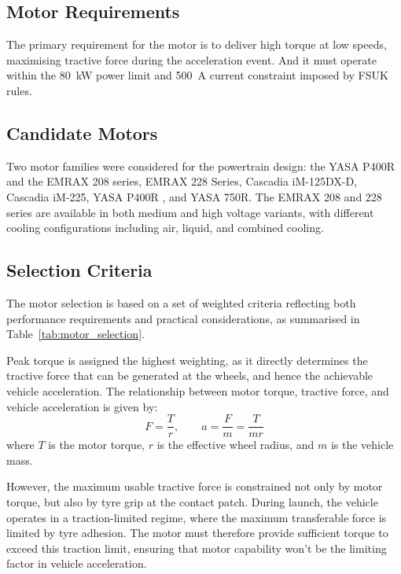 \documentclass[11pt, a4paper]{report}
\numberwithin{equation}{section}
\begin{document}
\begin{refsection}
\subsection{Motor Requirements}

The primary requirement for the motor is to deliver high torque at low speeds, maximising tractive force during the acceleration event. And it must operate within the \SI{80}{\kilo\watt} power limit and \SI{500}{\ampere} current constraint imposed by FSUK rules\cite{fs-ev-rules2026}.

\subsection{Candidate Motors}

Two motor families were considered for the powertrain design: the YASA P400R \cite{YASA_P400R_data_sheet} and the EMRAX 208 series\cite{EMRAX_208_data_sheet}, EMRAX 228 Series\cite{EMRAX_228_datasheet}, Cascadia iM-125DX-D\cite{Cascadia_iM125DXD_datasheet}, Cascadia iM-225\cite{Cascadia_iM225_datasheet}, YASA P400R \cite{YASA_P400R_data_sheet}, and YASA 750R\cite{YASA_750R_datasheet}. 
The EMRAX 208 and 228 series are available in both medium and high voltage variants, with different cooling configurations including air, liquid, and combined cooling.

\subsection{Selection Criteria}

The motor selection is based on a set of weighted criteria reflecting both performance requirements and practical considerations, as summarised in Table~\ref{tab:motor_selection}.

Peak torque is assigned the highest weighting, as it directly determines the tractive force that can be generated at the wheels, and hence the achievable vehicle acceleration. The relationship between motor torque, tractive force, and vehicle acceleration is given by:
\begin{equation}
F = \frac{T}{r}, \qquad
a = \frac{F}{m} = \frac{T}{mr}
\end{equation}
where $T$ is the motor torque, $r$ is the effective wheel radius, and $m$ is the vehicle mass.

However, the maximum usable tractive force is constrained not only by motor torque, but also by tyre grip at the contact patch. During launch, the vehicle operates in a traction-limited regime, where the maximum transferable force is limited by tyre adhesion. The motor must therefore provide sufficient torque to exceed this traction limit, ensuring that motor capability won't be the limiting factor in vehicle acceleration.


\end{refsection}
\end{document}
